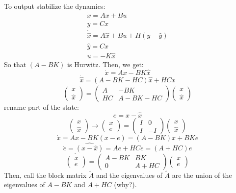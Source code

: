 \documentclass{article}
\begin{document}
To output stabilize the dynamics:
\[\begin{array}{c}\dot{x}=Ax+Bu\\y=Cx\\\dot{\hat{x}}=A\hat{x}+Bu+H(y-\hat{y})\\\hat{y}=C\hat{x}\\u=-K\hat{x}\end{array}\]
So that $(A-BK)$ is Hurwitz. Then, we get:
\[\dot{x}=Ax-BK\hat{x}\]
\[\dot{\hat{x}}=(A-BK-HC)\hat{x}+HCx\]
\[\dot{\begin{pmatrix}x\\\hat{x}\end{pmatrix}}=\begin{pmatrix}A&-BK\\HC&A-BK-HC\end{pmatrix}\begin{pmatrix}x\\\hat{x}\end{pmatrix}\]
rename part of the state:\\
\[e=x-\hat{x}\]
\[\begin{pmatrix}x\\\hat{x}\end{pmatrix}\to\begin{pmatrix}x\\e\end{pmatrix}=\begin{pmatrix}I&0\\I&-I\end{pmatrix}\begin{pmatrix}x\\\hat{x}\end{pmatrix}\]
\[\dot{x}=Ax-BK(x-e)=(A-BK)x+BKe\]
\[\dot{e}=\hat{(x-\hat{x})}=Ae+HCe=(A+HC)e\]
\[\dot{\begin{pmatrix}x\\e\end{pmatrix}}=\begin{pmatrix}A-BK&BK\\0&A+HC\end{pmatrix}\begin{pmatrix}x\\e\end{pmatrix}\]
Then, call the block matrix $\tilde{A}$ and the eigenvalues of $\tilde{A}$ are the union of the eigenvalues of $A-BK$ and $A+HC$ (why?).\\
\end{document}
